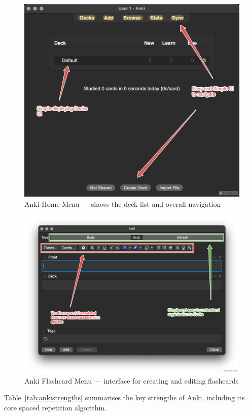 \documentclass[a4paper,12pt]{article}
\begin{document}
\begin{figure}[H]
    \centering
    \includegraphics[width=0.7\linewidth]{../Screenshots/AnkiHome.png}
    \caption{Anki Home Menu — shows the deck list and overall navigation}
    \label{fig:anki-home}
\end{figure}

\begin{figure}[H]
    \centering
    \includegraphics[width=0.7\linewidth]{../Screenshots/AnkiFlashcard.png}
    \caption{Anki Flashcard Menu — interface for creating and editing flashcards}
    \label{fig:anki-flashcard-menu}
\end{figure}

Table~\ref{tab:ankistrengths} summarises the key strengths of Anki, including its core spaced repetition algorithm.

\end{document}
